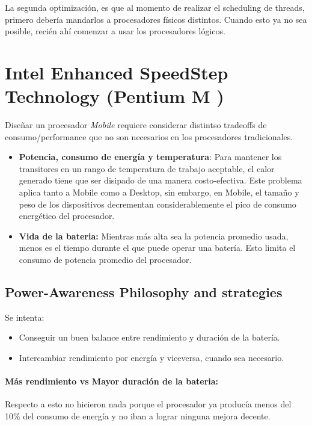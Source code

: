 La segunda optimización, es que al momento de realizar el scheduling de threads, primero debería mandarlos a procesadores físicos distintos. Cuando esto ya no sea posible, recién ahí comenzar a usar los procesadores lógicos.

\newpage
\section{Intel Enhanced SpeedStep Technology (Pentium M \cite{Gochman2003TheIP})}

Diseñar un procesador \textit{Mobile} requiere considerar distintso tradeoffs de consumo/performance que no son necesarios en los procesadores tradicionales.

\begin{itemize}
	\item \textbf{Potencia, consumo de energía y temperatura}: Para mantener los transitores en un rango de temperatura de trabajo aceptable, el calor generado tiene que ser disipado de una manera costo-efectiva. Este problema aplica tanto a Mobile como a Desktop, sin embargo, en Mobile, el tamaño y peso de los dispositivos decrementan considerablemente el pico de consumo energético del procesador.

	\item \textbf{Vida de la bateria:} Mientras más alta sea la potencia promedio usada, menos es el tiempo durante el que puede operar una batería. Esto limita el consumo de potencia promedio del procesador.
\end{itemize}

\subsection{Power-Awareness Philosophy and strategies}
Se intenta: 
\begin{itemize}
	\item Conseguir un buen balance entre rendimiento y duración de la batería.
	\item Intercambiar rendimiento por energía y viceversa, cuando sea necesario.
\end{itemize}

\paragraph{Más rendimiento vs Mayor duración de la bateria:} Respecto a esto no hicieron nada porque el procesador ya producía menos del 10\% del consumo de energía y no iban a lograr ninguna mejora decente.

